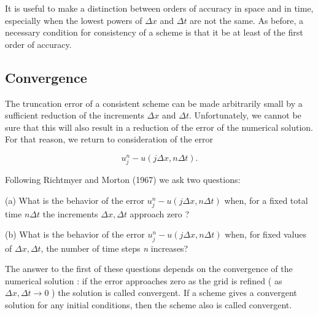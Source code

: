 It is useful to make a distinction between orders of accuracy in space
and in time, especially when the lowest powers of \(\Delta x\) and
\(\Delta t\) are not the same. As before, a necessary condition for
consistency of a scheme is that it be at least of the first order of
accuracy.

\subsection{\texorpdfstring{\textbf{Convergence}}{Convergence}}\label{Section1.5}

The truncation error of a consistent scheme can be made arbitrarily
small by a sufficient reduction of the increments \(\Delta x\) and
\(\Delta t\). Unfortunately, we cannot be sure that this will also
result in a reduction of the error of the numerical solution. For that
reason, we return to consideration of the error

\[u_j^n-u\left( j\Delta x,n\Delta t \right).\]

Following Richtmyer and Morton (1967) we ask two questions:

(a) What is the behavior of the error
\(u_{j}^{n} - u\left( j\Delta x,n\Delta t \right)\) when, for a fixed
total time \(n \Delta t\) the increments \(\Delta x , \Delta t\)
approach zero ?

(b) What is the behavior of the error
\(u_{j}^{n} - u\left( j\Delta x,n\Delta t \right)\) when, for fixed
values of \(\Delta x, \Delta t\), the number of time steps \emph{n}
increases?

The answer to the first of these questions depends on the convergence of
the numerical solution : if the error approaches zero as the grid is
refined ( as \(\Delta x, \Delta t \rightarrow 0\) ) the solution is
called convergent. If a scheme gives a convergent solution for any
initial conditions, then the scheme also is called convergent.

